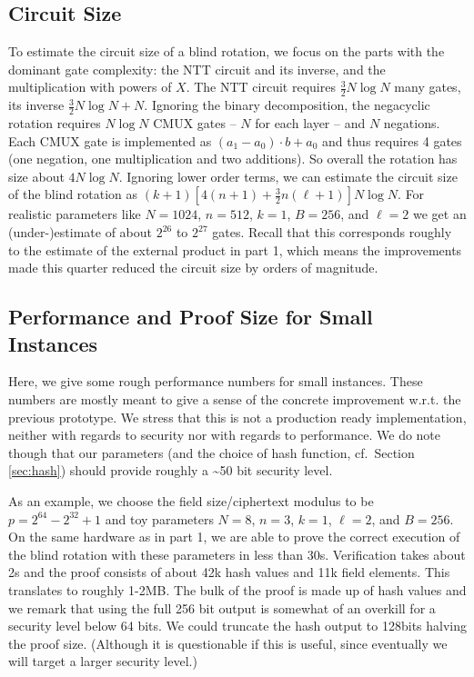 \documentclass{zamarep}
\begin{document}
\subsection{Circuit Size}
\label{sec:csize}
To estimate the circuit size of a blind rotation, we focus on the parts with the dominant gate complexity: the NTT circuit and its inverse, and the multiplication with powers of $X$. The NTT circuit requires $\frac32 N \log N$ many gates, its inverse $\frac32 N \log N + N$. Ignoring the binary decomposition, the negacyclic rotation requires $N \log N$ CMUX gates -- $N$ for each layer -- and $N$ negations. Each CMUX gate is implemented as $(a_1 - a_0) \cdot b + a_0$ and thus requires 4 gates (one negation, one multiplication and two additions). So overall the rotation has size about $4 N \log N$. Ignoring lower order terms, we can estimate the circuit size of the blind rotation as $(k + 1) [4 (n + 1) +  \frac32 n (\ell + 1)]N \log N$. For realistic parameters like $N=1024$, $n=512$, $k=1$, $B=256$, and $\ell=2$ we get an (under-)estimate of about $2^{26}$ to $2^{27}$ gates. Recall that this corresponds roughly to the estimate of the external product in part 1, which means the improvements made this quarter reduced the circuit size by orders of magnitude.

\subsection{Performance and Proof Size for Small Instances}
\label{sec:small}
Here, we give some rough performance numbers for small instances. These numbers are mostly meant to give a sense of the concrete improvement w.r.t. the previous prototype. We stress that this is not a production ready implementation, neither with regards to security nor with regards to performance. We do note though that our parameters (and the choice of hash function, cf.\ Section \ref{sec:hash}) should provide roughly a \textasciitilde50 bit security level.

As an example, we choose the field size/ciphertext modulus to be $p=2^{64} - 2^{32} + 1$ and toy parameters $N=8$, $n=3$, $k=1$, $\ell=2$, and $B=256$. On the same hardware as in part 1, we are able to prove the correct execution of the blind rotation with these parameters in less than 30s. Verification takes about 2s and the proof consists of about 42k hash values and 11k field elements. This translates to roughly 1-2MB. The bulk of the proof is made up of hash values and we remark that using the full 256 bit output is somewhat of an overkill for a security level below 64 bits. We could truncate the hash output to 128bits halving the proof size. (Although it is questionable if this is useful, since eventually we will target a larger security level.)
\end{document}
